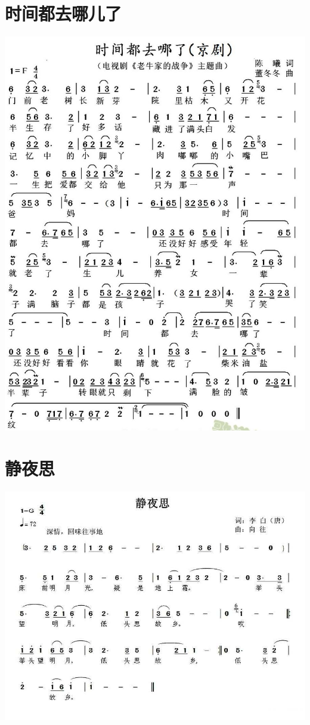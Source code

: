 \documentclass[cn,pad,chinese]{elegantbook}
\begin{document}
\section{时间都去哪儿了}
    \includegraphics[width=\textwidth]{dongxiao/20200411-时间都去哪儿了.jpg} 
\section{静夜思}
    \includegraphics[width=\textwidth]{dongxiao/20200411-静夜思.jpg}
\end{document}
